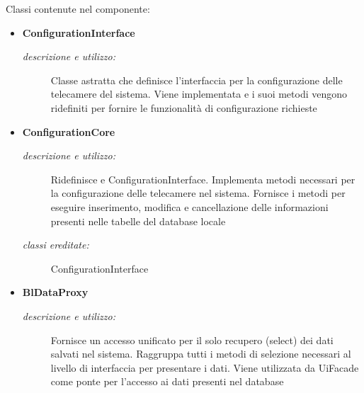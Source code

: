 Classi contenute nel componente: 
\begin{itemize} 
\item \textbf{ConfigurationInterface}
\begin{description}
\item [\textit{descrizione e utilizzo:}] Classe astratta che definisce l'interfaccia per la configurazione delle telecamere del sistema. Viene implementata e i suoi metodi vengono ridefiniti per fornire le funzionalità di configurazione richieste
\end{description}
\item \textbf{ConfigurationCore}
\begin{description}
\item [\textit{descrizione e utilizzo:}] Ridefinisce e ConfigurationInterface. Implementa metodi necessari per la configurazione delle telecamere nel sistema. Fornisce i metodi per eseguire inserimento, modifica e cancellazione delle informazioni presenti nelle tabelle del database locale
\item [\textit{classi ereditate:}] ConfigurationInterface
\end{description}
\item \textbf{BlDataProxy}
\begin{description}
\item [\textit{descrizione e utilizzo:}] Fornisce un accesso unificato per il solo recupero (select) dei dati salvati nel sistema. Raggruppa tutti i metodi di selezione necessari al livello di interfaccia per presentare i dati. Viene utilizzata da UiFacade come ponte per l'accesso ai dati presenti nel database
\end{description}
\end{itemize}


